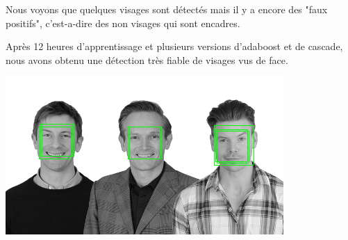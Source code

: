 \documentclass[12pt,a4paper]{article}
\begin{document}
\vspace{0.8cm}
Nous voyons que quelques visages sont détectés mais il y a encore des "faux positifs", c'est-a-dire des non visages qui sont encadres.

\vspace{0.8cm}
Après 12 heures d'apprentissage et plusieurs versions d'adaboost et de cascade, nous avons obtenu une détection très fiable de visages vus de face.
\vspace{0.8cm}
\begin{center}
\includegraphics[scale=0.5]{Pictures/detection.png}
\end{center}
\end{document}
